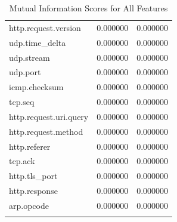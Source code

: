 \documentclass{article}
\begin{document}
\begin{longtable}{lrr}
http.request.version & 0.000000 & 0.000000 \\
udp.time_delta & 0.000000 & 0.000000 \\
udp.stream & 0.000000 & 0.000000 \\
udp.port & 0.000000 & 0.000000 \\
icmp.checksum & 0.000000 & 0.000000 \\
tcp.seq & 0.000000 & 0.000000 \\
http.request.uri.query & 0.000000 & 0.000000 \\
http.request.method & 0.000000 & 0.000000 \\
http.referer & 0.000000 & 0.000000 \\
tcp.ack & 0.000000 & 0.000000 \\
http.tls_port & 0.000000 & 0.000000 \\
http.response & 0.000000 & 0.000000 \\
arp.opcode & 0.000000 & 0.000000 \\
\bottomrule
\caption{Mutual Information Scores for All Features}
\end{longtable}
\end{document}

